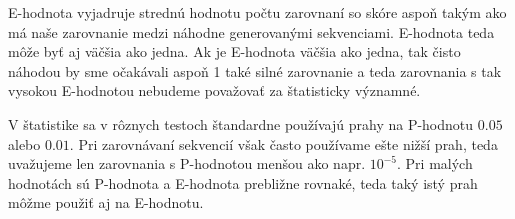 E-hodnota vyjadruje strednú hodnotu počtu zarovnaní so skóre aspoň takým ako má naše zarovnanie medzi náhodne generovanými sekvenciami. E-hodnota teda môže byť aj väčšia ako jedna. Ak je E-hodnota väčšia ako jedna, tak čisto náhodou by sme očakávali aspoň 1 také silné zarovnanie a teda zarovnania s tak vysokou E-hodnotou nebudeme považovať za štatisticky významné.

V štatistike sa v rôznych testoch štandardne používajú prahy na P-hodnotu $0.05$ alebo $0.01$.
Pri zarovnávaní sekvencií však často používame ešte nižší prah, teda uvažujeme len zarovnania s P-hodnotou menšou ako napr. $10^{-5}$. Pri malých hodnotách sú P-hodnota a E-hodnota prebližne rovnaké, teda taký istý prah môžme použiť aj na E-hodnotu.
